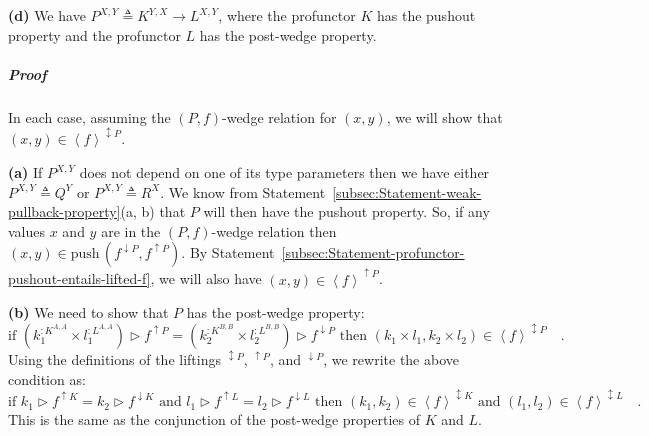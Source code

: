 \textbf{(d)} We have $P^{X,Y}\triangleq K^{Y,X}\rightarrow L^{X,Y}$,
where the profunctor $K$ has the pushout property and the profunctor
$L$ has the post-wedge property.%
\begin{comment}
\textbf{(e)} We have a recursive type $P^{X,Y}\triangleq S^{X,Y,P^{X,Y}}$,
where $S^{X,Y,R}$ is contravariant in $X$ and covariant in $Y$
and $R$, and has the post-wedge property when viewed as a profunctor
with respect to $X$ and $Y$. Does the post-wedge really hold for
$P$?
\end{comment}


\subparagraph{Proof}

In each case, assuming the $\left(P,f\right)$-wedge relation for
$(x,y)$, we will show that $(x,y)\in\left<f\right>^{\updownarrow P}$. 

\textbf{(a)} If $P^{X,Y}$ does not depend on one of its type parameters
then we have either $P^{X,Y}\triangleq Q^{Y}$ or $P^{X,Y}\triangleq R^{X}$.
We know from Statement~\ref{subsec:Statement-weak-pullback-property}(a,
b) that $P$ will then have the pushout property. So, if any values
$x$ and $y$ are in the $\left(P,f\right)$-wedge relation then $(x,y)\in\text{push}\,(f^{\downarrow P},f^{\uparrow P})$.
By Statement~\ref{subsec:Statement-profunctor-pushout-entails-lifted-f},
we will also have $(x,y)\in\left<f\right>^{\uparrow P}$.

\textbf{(b)} We need to show that $P$ has the post-wedge property:
\[
\text{if }(k_{1}^{:K^{A,A}}\times l_{1}^{:L^{A,A}})\triangleright f^{\uparrow P}=(k_{2}^{:K^{B,B}}\times l_{2}^{:L^{B,B}})\triangleright f^{\downarrow P}\text{ then }(k_{1}\times l_{1},k_{2}\times l_{2})\in\left<f\right>^{\updownarrow P}\quad.
\]
Using the definitions of the liftings $^{\updownarrow P}$, $^{\uparrow P}$,
and $^{\downarrow P}$, we rewrite the above condition as:
\[
\text{if }k_{1}\triangleright f^{\uparrow K}=k_{2}\triangleright f^{\downarrow K}\text{ and }l_{1}\triangleright f^{\uparrow L}=l_{2}\triangleright f^{\downarrow L}\text{ then }(k_{1},k_{2})\in\left<f\right>^{\updownarrow K}\text{ and }(l_{1},l_{2})\in\left<f\right>^{\updownarrow L}\quad.
\]
This is the same as the conjunction of the post-wedge properties of
$K$ and $L$. 

